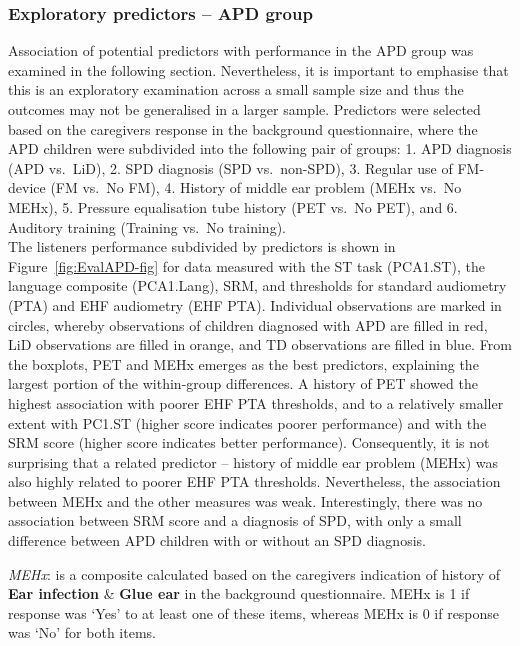\documentclass[a4paper, twoside]{templates/ociamthesis}
\begin{document}
\hypertarget{exploratory-predictors-apd-group}{%
\subsubsection{Exploratory predictors -- APD group}\label{exploratory-predictors-apd-group}}

Association of potential predictors with performance in the APD group was examined in the following section. Nevertheless, it is important to emphasise that this is an exploratory examination across a small sample size and thus the outcomes may not be generalised in a larger sample. Predictors were selected based on the caregivers response in the background questionnaire, where the APD children were subdivided into the following pair of groups: 1. APD diagnosis (APD vs.~LiD), 2. SPD diagnosis (SPD vs.~non-SPD), 3. Regular use of FM-device (FM vs.~No FM), 4. History of middle ear problem (MEHx vs.~No MEHx), 5. Pressure equalisation tube history (PET vs.~No PET), and 6. Auditory training (Training vs.~No training).\\

The listeners performance subdivided by predictors is shown in Figure~\ref{fig:EvalAPD-fig} for data measured with the ST task (PCA1.ST), the language composite (PCA1.Lang), SRM, and thresholds for standard audiometry (PTA) and EHF audiometry (EHF PTA). Individual observations are marked in circles, whereby observations of children diagnosed with APD are filled in red, LiD observations are filled in orange, and TD observations are filled in blue. From the boxplots, PET and MEHx emerges as the best predictors, explaining the largest portion of the within-group differences. A history of PET showed the highest association with poorer EHF PTA thresholds, and to a relatively smaller extent with PC1.ST (higher score indicates poorer performance) and with the SRM score (higher score indicates better performance). Consequently, it is not surprising that a related predictor -- history of middle ear problem (MEHx) was also highly related to poorer EHF PTA thresholds. Nevertheless, the association between MEHx and the other measures was weak. Interestingly, there was no association between SRM score and a diagnosis of SPD, with only a small difference between APD children with or without an SPD diagnosis.\\

\begin{correction}
\emph{MEHx}: is a composite calculated based on the caregivers
indication of history of \textbf{Ear infection} \& \textbf{Glue ear} in
the background questionnaire. MEHx is 1 if response was `Yes' to at
least one of these items, whereas MEHx is 0 if response was `No' for
both items.
\end{correction}
\end{document}
